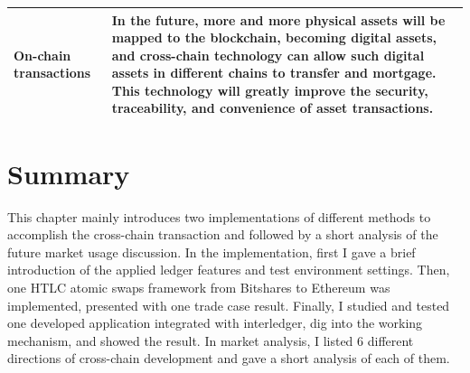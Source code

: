 \begin{longtable}{l|p{7cm}}
\midrule
On-chain transactions & In the future, more and more physical assets will be mapped to the blockchain, becoming digital assets, and cross-chain technology can allow such digital assets in different chains to transfer and mortgage. This technology will greatly improve the security, traceability, and convenience of asset transactions.\\
\bottomrule


\end{longtable}


\section{Summary}
\label{sec:sum4}
\noindent This chapter mainly introduces two implementations of different methods to accomplish the cross-chain transaction and followed by a short analysis of the future market usage discussion. In the implementation, first I gave a brief introduction of the applied ledger features and test environment settings. Then, one HTLC atomic swaps framework from Bitshares to Ethereum was implemented, presented with one trade case result. Finally, I studied and tested one developed application integrated with interledger, dig into the working mechanism, and showed the result. In market analysis, I listed 6 different directions of cross-chain development and gave a short analysis of each of them.
